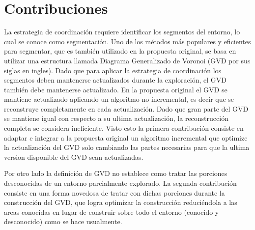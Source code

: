 

\section{Contribuciones}

La estrategia de coordinación requiere identificar los segmentos del entorno,
lo cual se conoce como segmentación. Uno de los métodos más populares y
eficientes para segmentar, que es también utilizado en la propuesta original, se
basa en utilizar una estructura llamada Diagrama Generalizado de Voronoi (GVD
por sus siglas en ingles). Dado que para aplicar la estrategia de coordinación
los segmentos deben mantenerse actualizados durante la exploración, el GVD
también debe mantenerse actualizado. En la propuesta original el GVD se
mantiene actualizado aplicando un algoritmo no incremental, es decir que se
reconstruye completamente en cada actualización. Dado que gran parte del GVD se
mantiene igual con respecto a su ultima actualización, la reconstrucción
completa se considera ineficiente. Visto esto la primera contribución
consiste en adaptar e integrar a la propuesta original un algoritmo incremental
que optimize la actualización del GVD solo cambiando las partes necesarias para
que la ultima version disponible del GVD sean actualizadas. 


Por otro lado la definición de GVD no establece como tratar las porciones
desconocidas de un entorno parcialmente explorado. La segunda contribución
consiste en una forma novedosa de tratar con dichas porciones durante la
construcción del GVD, que logra optimizar la construcción reduciéndola a las areas
conocidas en lugar de construir sobre todo el entorno (conocido y desconocido)
como se hace usualmente.

